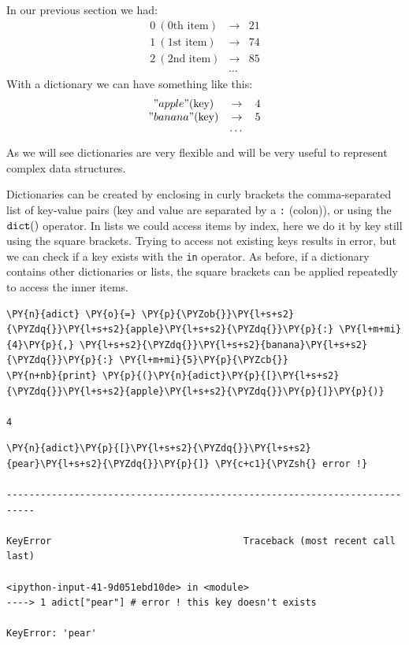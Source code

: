 In our previous section we had:
\[
\begin{matrix} 
0~(\textrm{0th item})& \rightarrow& 21\\
1~(\textrm{1st item})& \rightarrow& 74\\
2~(\textrm{2nd item})& \rightarrow& 85\\ 
&\cdots&  
\end{matrix}
\]
With a dictionary we can have something like this:
\[
\begin{matrix}
"apple" (\textrm{key})&\rightarrow& 4 \\
"banana" (\textrm{key})& \rightarrow& 5 \\
&\cdots&
\end{matrix}
\]
As we will see dictionaries are very flexible and will be very useful to represent complex data structures.

Dictionaries can be created by enclosing in curly brackets the comma-separated list of key-value pairs 
(key and value are separated by a \texttt{:} (colon)), or using the $\tt{dict()}$ operator.
In lists we could access items by index, here we do it by key still using the square brackets. 
Trying to access not existing keys results in error, but we can check if a key exists with the 
\texttt{in} operator.
As before, if a dictionary contains other dictionaries or lists, the square brackets can be applied 
repeatedly to access the inner items.

\begin{tcolorbox}[breakable, size=fbox, boxrule=1pt, pad at break*=1mm, colback=cellbackground, colframe=cellborder]
\begin{Verbatim}[commandchars=\\\{\}]
\PY{n}{adict} \PY{o}{=} \PY{p}{\PYZob{}}\PY{l+s+s2}{\PYZdq{}}\PY{l+s+s2}{apple}\PY{l+s+s2}{\PYZdq{}}\PY{p}{:} \PY{l+m+mi}{4}\PY{p}{,} \PY{l+s+s2}{\PYZdq{}}\PY{l+s+s2}{banana}\PY{l+s+s2}{\PYZdq{}}\PY{p}{:} \PY{l+m+mi}{5}\PY{p}{\PYZcb{}}
\PY{n+nb}{print} \PY{p}{(}\PY{n}{adict}\PY{p}{[}\PY{l+s+s2}{\PYZdq{}}\PY{l+s+s2}{apple}\PY{l+s+s2}{\PYZdq{}}\PY{p}{]}\PY{p}{)}

4
\end{Verbatim}
\end{tcolorbox}

\begin{tcolorbox}[breakable, size=fbox, boxrule=1pt, pad at break*=1mm, colback=cellbackground, colframe=cellborder]
\begin{Verbatim}[commandchars=\\\{\}]
\PY{n}{adict}\PY{p}{[}\PY{l+s+s2}{\PYZdq{}}\PY{l+s+s2}{pear}\PY{l+s+s2}{\PYZdq{}}\PY{p}{]} \PY{c+c1}{\PYZsh{} error !}

---------------------------------------------------------------------------

KeyError                                  Traceback (most recent call last)

<ipython-input-41-9d051ebd10de> in <module>
----> 1 adict["pear"] # error ! this key doesn't exists
    
KeyError: 'pear'
\end{Verbatim}
\end{tcolorbox}

